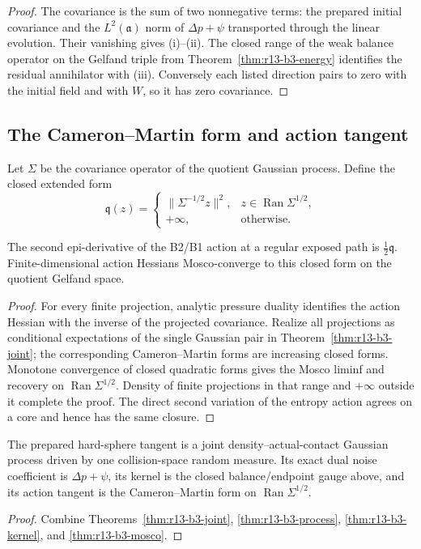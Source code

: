 \begin{proof}
The covariance is the sum of two nonnegative terms: the prepared initial
covariance and the $L^2(\mathfrak a)$ norm of
$\Delta p+\psi$ transported through the linear evolution.  Their vanishing
gives (i)--(ii).  The closed range of the weak balance operator on the Gelfand
triple from Theorem~\ref{thm:r13-b3-energy} identifies the residual annihilator
with (iii).  Conversely each listed direction pairs to zero with the initial
field and with $W$, so it has zero covariance.
\end{proof}

\subsection{The Cameron--Martin form and action tangent}

Let $\Sigma$ be the covariance operator of the quotient Gaussian process.
Define the closed extended form
\[
 \mathfrak q(z)=
 \begin{cases}
 \|\Sigma^{-1/2}z\|^2,
 &z\in\operatorname{Ran}\Sigma^{1/2},\\
 +\infty,&\text{otherwise}.
 \end{cases}
\]

\begin{theorem}
\label{thm:r13-b3-mosco}
The second epi-derivative of the B2/B1 action at a regular exposed path is
$\tfrac12\mathfrak q$.  Finite-dimensional action Hessians Mosco-converge to
this closed form on the quotient Gelfand space.
\end{theorem}

\begin{proof}
For every finite projection, analytic pressure duality identifies the action
Hessian with the inverse of the projected covariance.  Realize all
projections as conditional expectations of the single Gaussian pair in
Theorem~\ref{thm:r13-b3-joint}; the corresponding Cameron--Martin forms are
increasing closed forms.  Monotone convergence of closed quadratic forms gives
the Mosco liminf and recovery on
$\operatorname{Ran}\Sigma^{1/2}$.  Density of finite projections in that range
and $+\infty$ outside it complete the proof.  The direct second variation of
the entropy action agrees on a core and hence has the same closure.
\end{proof}

\begin{theorem}
\label{thm:r13-b3-main}
The prepared hard-sphere tangent is a joint density--actual-contact Gaussian
process driven by one collision-space random measure.  Its exact dual noise
coefficient is $\Delta p+\psi$, its kernel is the closed balance/endpoint
gauge above, and its action tangent is the Cameron--Martin form on
$\operatorname{Ran}\Sigma^{1/2}$.
\end{theorem}

\begin{proof}
Combine Theorems~\ref{thm:r13-b3-joint},
\ref{thm:r13-b3-process}, \ref{thm:r13-b3-kernel}, and
\ref{thm:r13-b3-mosco}.
\end{proof}
